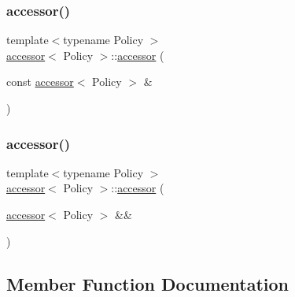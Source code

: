 \mbox{\label{classaccessor_aca9ebf02da5b9869397d12fbda0e8854}} 
\subsubsection{\texorpdfstring{accessor()}{accessor()}\hspace{0.1cm}{\footnotesize\ttfamily [2/3]}}
{\footnotesize\ttfamily template$<$typename Policy $>$ \\
\mbox{\hyperlink{classaccessor}{accessor}}$<$ Policy $>$\+::\mbox{\hyperlink{classaccessor}{accessor}} (\begin{DoxyParamCaption}\item[{const \mbox{\hyperlink{classaccessor}{accessor}}$<$ Policy $>$ \&}]{ }\end{DoxyParamCaption})\hspace{0.3cm}{\ttfamily [default]}}

\mbox{\label{classaccessor_a60c29e25d1efacef831283af158fd16b}} 
\subsubsection{\texorpdfstring{accessor()}{accessor()}\hspace{0.1cm}{\footnotesize\ttfamily [3/3]}}
{\footnotesize\ttfamily template$<$typename Policy $>$ \\
\mbox{\hyperlink{classaccessor}{accessor}}$<$ Policy $>$\+::\mbox{\hyperlink{classaccessor}{accessor}} (\begin{DoxyParamCaption}\item[{\mbox{\hyperlink{classaccessor}{accessor}}$<$ Policy $>$ \&\&}]{ }\end{DoxyParamCaption})\hspace{0.3cm}{\ttfamily [default]}}



\subsection{Member Function Documentation}
\mbox{\label{classaccessor_a3d1b6cebd43e008d426f69e2440940a3}} 
